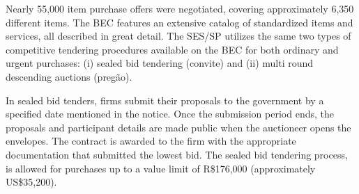 \documentclass[12 pt]{elsarticle}
\begin{document}


Nearly 55,000 item purchase offers were negotiated, covering approximately 6,350 different items. The BEC features an extensive catalog of standardized items and services, all described in great detail. The SES/SP utilizes the same two types of competitive tendering procedures available on the BEC for both ordinary and urgent purchases: (i) sealed bid tendering (convite) and (ii) multi round descending auctions (pregão).



In sealed bid tenders, firms submit their proposals to the government by a specified date mentioned in the notice. Once the submission period ends, the proposals and participant details are made public when the auctioneer opens the envelopes. The contract is awarded to the firm with the appropriate documentation that submitted the lowest bid. The sealed bid tendering process, is allowed for purchases up to a value limit of R\$176,000 (approximately US\$35,200).


\end{document}
